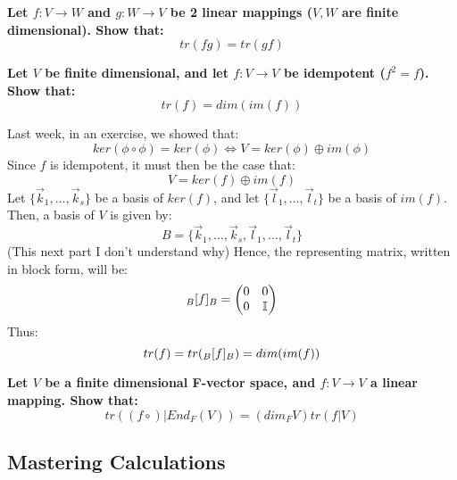\documentclass{exam}
\begin{document}
\begin{questions}
\begin{parts}
\end{parts}

\question \textbf{Let $f : V \to W$ and $g : W \to V$ be 2 linear mappings ($V,W$ are finite dimensional). Show that:
\[
tr(fg) = tr(gf)
\]}

\question \textbf{Let $V$ be finite dimensional, and let $f : V \to V$ be idempotent ($f^2 = f$). Show that:
\[
tr(f) = dim(im(f))
\]}

Last week, in an exercise, we showed that:
\[
ker(\phi \circ \phi) = ker(\phi) \iff V = ker(\phi) \oplus im(\phi)
\]
Since $f$ is idempotent, it must then be the case that:
\[
V = ker(f) \oplus im(f)
\]
Let $\{\vec{k}_1, \ldots, \vec{k}_s\}$ be a basis of $ker(f)$, and let $\{\vec{l}_1, \ldots, \vec{l}_t\}$ be a basis of $im(f)$. Then, a basis of $V$ is given by:
\[
B = \{\vec{k}_1, \ldots, \vec{k}_s, \vec{l}_1, \ldots, \vec{l}_t\}
\]
(This next part I don't understand why)
Hence, the representing matrix, written in block form, will be:
\[
\cript{f}{B}{B} = \begin{pmatrix}
0 & 0 \\
0 & \mathbb{I}
\end{pmatrix}
\]
Thus:
\[
tr(f) = tr(\cript{f}{B}{B}) = dim(im(f))
\]

\question \textbf{Let $V$ be a finite dimensional F-vector space, and $f : V \to V$ a linear mapping. Show that:
\[
tr((f \circ) | End_F(V)) = (dim_FV)tr(f | V)
\]}

\end{questions}

\subsection{Mastering Calculations}
\end{document}
